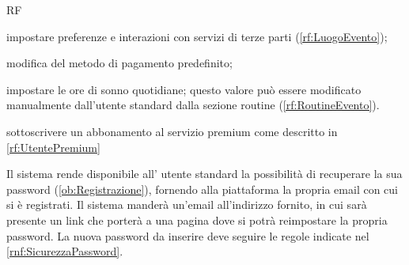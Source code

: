 \begin{listaPersonale}{RF}
\begin{listaPersonale2}[RF]{}
		 impostare preferenze e interazioni con servizi di terze parti (\ref{rf:LuogoEvento});

		 modifica del metodo di pagamento predefinito;

		 impostare le ore di sonno quotidiane; questo valore può essere modificato manualmente dall'utente standard dalla sezione routine (\ref{rf:RoutineEvento}).

		 sottoscrivere un abbonamento al servizio premium come descritto in \ref{rf:UtentePremium}
	\end{listaPersonale2}

	        Il sistema rende disponibile all' utente standard la possibilità di recuperare la sua password (\ref{ob:Registrazione}), fornendo alla piattaforma la propria email con cui si è registrati. Il sistema manderà un'email all'indirizzo fornito, in cui sarà presente un link che porterà a una pagina dove si potrà reimpostare la propria password. La nuova password da inserire deve seguire le regole indicate nel  \ref{rnf:SicurezzaPassword}. %
\end{listaPersonale}